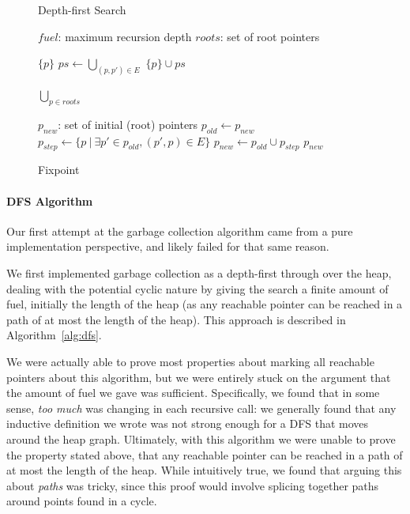 \documentclass{article}
\begin{document}
\begin{figure}[H]
\begin{minipage}{0.49\textwidth}
\begin{algorithm}[H]
   \caption{Depth-first Search}
   \label{alg:dfs}
\begin{algorithmic}[0]
   $fuel$: maximum recursion depth
   $roots$: set of root pointers
  
     \Return $\{p\}$
     \EndIf
     \State $ps \leftarrow \bigcup_{(p, p') \in E}$ 
     \State
     \Return $\{p\} \cup ps$ 
     
    \EndFunction
    \State
    \Return $\bigcup_{p \in roots}$ 
\end{algorithmic}
\end{algorithm}
\end{minipage}
\begin{minipage}{0.49\textwidth}
\begin{algorithm}[H]
   \caption{Fixpoint}
   \label{alg:fixpoint}
\begin{algorithmic}[0]
   $p_{new}$: set of initial (root) pointers
 \Repeat 
 \State $p_{old} \leftarrow p_{new}$
 \State $p_{step} \leftarrow \{p\ |\ \exists p' \in p_{old}, (p', p) \in E\}$
 \State $p_{new} \leftarrow p_{old} \cup p_{step}$
 \State
 \Return $p_{new}$
\end{algorithmic}
\end{algorithm}
\end{minipage}
\end{figure}

\paragraph{DFS Algorithm}
Our first attempt at the garbage collection algorithm came from a pure implementation perspective, and likely failed for that same reason.

We first implemented garbage collection as a depth-first through over the heap, dealing with the potential cyclic nature by giving the search a finite amount of fuel, initially the length of the heap (as any reachable pointer can be reached in a path of at most the length of the heap).
This approach is described in Algorithm~\ref{alg:dfs}.

We were actually able to prove most properties about marking all reachable pointers about this algorithm, but we were entirely stuck on the argument that the amount of fuel we gave was sufficient. 
Specifically, we found that in some sense, \emph{too much} was changing in each recursive call: we generally found that any inductive definition we wrote was not strong enough for a DFS that moves around the heap graph.
Ultimately, with this algorithm we were unable to prove the property stated above, that any reachable pointer can be reached in a path of at most the length of the heap.
While intuitively true, we found that arguing this about \textit{paths} was tricky, since this proof would involve splicing together paths around points found in a cycle.
\end{document}

